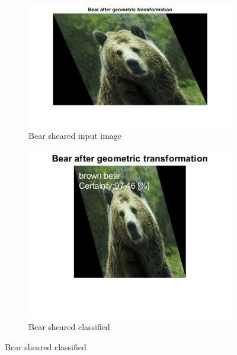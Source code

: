\documentclass[a4paper]{iacas}
\begin{document}
\vskip 0.1in
\begin{figure}
  \begin{subfigure}{0.4\linewidth}
	\includegraphics[width=\linewidth]{imgs/bear_sheared.png}
	\caption{Bear sheared input image}
  \end{subfigure}
  \begin{subfigure}{0.4\linewidth}
	\includegraphics[width=\linewidth]{imgs/bear_sheared_classified.png}
	\caption{Bear sheared classified}
  \end{subfigure}


\end{figure}
\end{document}
